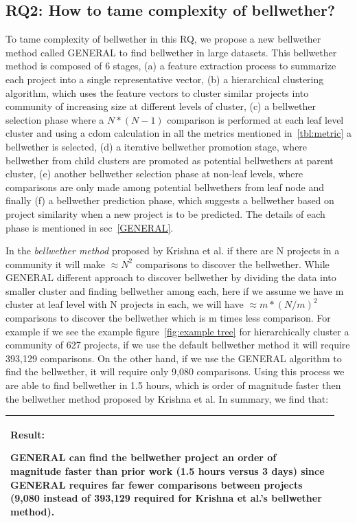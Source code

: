 \documentclass[10pt,journal,compsoc]{IEEEtran}
\newenvironment{result}
{\vspace{0.15cm}
\noindent\begin{minipage}{\linewidth}
\begin{center}
\arrayrulecolor{lightergray}
\begin{tabular}{|p{0.95\linewidth}|}
\hline%
\rowcolor{lightergray}%
\textbf{Result:}~%
}
{\\\hline
\end{tabular}
\end{center}
\end{minipage}
\vspace{0.15cm}
}
\begin{document}
\subsection*{RQ2: How to tame complexity of bellwether?}
\label{sec:rq2}

To tame complexity of bellwether in this RQ, we propose a new bellwether method called GENERAL to find bellwether in large datasets. This bellwether method is composed of 6 stages, (a) a feature extraction process to summarize each project into a single representative vector, (b) a hierarchical clustering algorithm, which uses the feature vectors to cluster similar projects into community of increasing size at different levels of cluster, (c) a bellwether selection phase where a $N*(N-1)$ comparison is performed at each leaf level cluster and using a cdom calculation in all the metrics mentioned in~\ref{tbl:metric} a bellwether is selected, (d) a iterative bellwether promotion stage, where bellwether from child clusters are promoted as potential bellwethers at parent cluster, (e) another bellwether selection phase at non-leaf levels, where comparisons are only made among potential bellwethers from leaf node and finally (f) a bellwether prediction phase, which suggests a bellwether based on project similarity when a new project is to be predicted. The details of each phase is mentioned in sec~\ref{GENERAL}. 

In the \textit{bellwether method} proposed by Krishna et al. if there are N projects in a community it will make $\approx N^2$ comparisons to discover the bellwether. While GENERAL different approach to discover bellwether by dividing the data into smaller cluster and finding bellwether among each, here if we assume we have m cluster at leaf level with N projects in each, we will have 
$\approx m*(N/m)^2$ comparisons to discover the bellwether which is m times less comparison. For example if we see the example figure~\ref{fig:example tree} for hierarchically cluster a community of 627 projects, if we use the default bellwether method it will require  393,129 comparisons. On the other hand, if we use the GENERAL algorithm to find the bellwether,  it will require only 9,080 comparisons. Using this process we are able to find bellwether in 1.5 hours, which is order of magnitude faster then the bellwether method proposed by Krishna et al. In summary, we find that:

\begin{result}
{GENERAL can find the bellwether project
an order of magnitude faster than prior work
(1.5 hours versus 3 days)
since GENERAL  requires far fewer
 comparisons between projects
 (9,080 instead of 393,129 required for 
 Krishna et al.'s bellwether method). }
\end{result}
\end{document}
